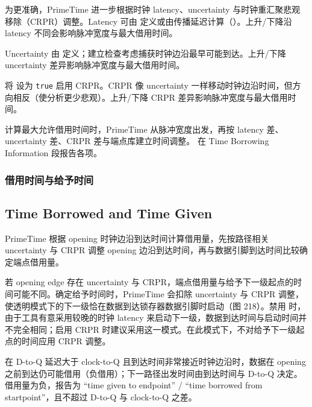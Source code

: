 
为更准确，PrimeTime 进一步根据时钟 latency、uncertainty 与时钟重汇聚悲观移除（CRPR）调整。Latency 可由  定义或由传播延迟计算（）。上升/下降沿 latency 不同会影响脉冲宽度与最大借用时间。

Uncertainty 由  定义；建立检查考虑捕获时钟边沿最早可能到达。上升/下降 uncertainty 差异影响脉冲宽度与最大借用时间。

将  设为 \texttt{true} 启用 CRPR。CRPR 像 uncertainty 一样移动时钟边沿时间，但方向相反（使分析更少悲观）。上升/下降 CRPR 差异影响脉冲宽度与最大借用时间。

计算最大允许借用时间时，PrimeTime 从脉冲宽度出发，再按 latency 差、uncertainty 差、CRPR 差与端点库建立时间调整。 在 Time Borrowing Information 段报告各项。

\subsubsection{借用时间与给予时间}
\subsection*{Time Borrowed and Time Given}

PrimeTime 根据 opening 时钟边沿到达时间计算借用量，先按路径相关 uncertainty 与 CRPR 调整 opening 边沿到达时间，再与数据引脚到达时间比较确定端点借用量。

若 opening edge 存在 uncertainty 与 CRPR，端点借用量与给予下一级起点的时间可能不同。确定给予时间时，PrimeTime 会扣除 uncertainty 与 CRPR 调整，使透明模式下的下一级恰在数据到达锁存器数据引脚时启动（图 218）。禁用  时，由于工具有意采用较晚的时钟 latency 来启动下一级，数据到达时间与启动时间并不完全相同；启用 CRPR 时建议采用这一模式。在此模式下，不对给予下一级起点的时间应用 CRPR 调整。


在 D-to-Q 延迟大于 clock-to-Q 且到达时间非常接近时钟边沿时，数据在 opening 之前到达仍可能借用（负借用）；下一路径出发时间由到达时间与 D-to-Q 决定。借用量为负，报告为 “time given to endpoint” / “time borrowed from startpoint”，且不超过 D-to-Q 与 clock-to-Q 之差。

